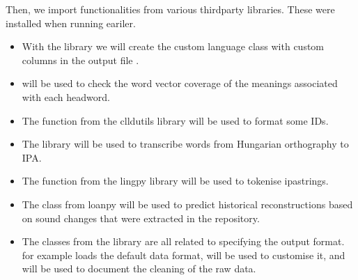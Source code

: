 \documentclass[letterpaper,10pt,english]{sphinxmanual}
\begin{document}
{{{{\sphinxAtStartPar
Then, we import functionalities from various third\sphinxhyphen{}party libraries.
These were installed when running 
eariler.
\begin{itemize}
\item {} 
\sphinxAtStartPar
With the  library
we will create the custom language class with custom columns in the output
file .

\item {} 
\sphinxAtStartPar
{} will be used to check the word
vector coverage of the meanings associated with each headword.

\item {} 
\sphinxAtStartPar
The 
function from the clldutils library will be used to format some IDs.

\item {} 
\sphinxAtStartPar
The  library will be used to
transcribe words from Hungarian orthography to IPA.

\item {} 
\sphinxAtStartPar
The 
function from the lingpy library will be used to tokenise ipa\sphinxhyphen{}strings.

\item {} 
\sphinxAtStartPar
The 
class from loanpy will be used to predict historical
reconstructions based on sound changes that were extracted in the
repository.

\item {} 
\sphinxAtStartPar
The classes from the 
library are all related to specifying the output format.  for
example
loads the default data format,  will be used to customise it, and
 will be used to document the cleaning of the raw data.


\end{itemize}}}}}
\end{document}
